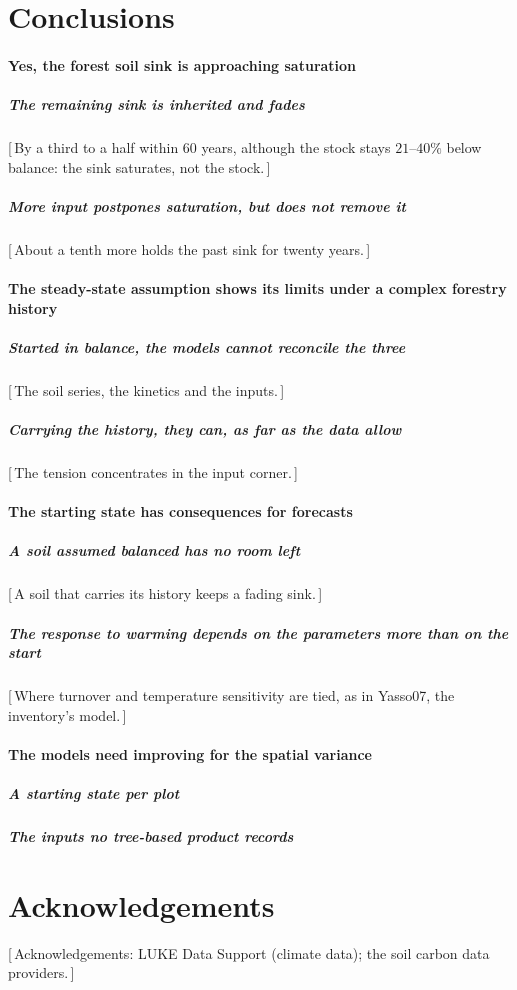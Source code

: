 \documentclass[11pt]{article}
\newcommand{\gap}[1]{\textcolor{red!70!black}{\small[\,#1\,]}}
\begin{document}
\section{Conclusions}\label{sec:conclusions}
\paragraph{Yes, the forest soil sink is approaching saturation}
\subparagraph{The remaining sink is inherited and fades}
\gap{By a third to a half within 60 years, although the stock stays $21$--$40\%$ below balance:
the sink saturates, not the stock.}
\subparagraph{More input postpones saturation, but does not remove it}
\gap{About a tenth more holds the past sink for twenty years.}
\paragraph{The steady-state assumption shows its limits under a complex forestry history}
\subparagraph{Started in balance, the models cannot reconcile the three}
\gap{The soil series, the kinetics and the inputs.}
\subparagraph{Carrying the history, they can, as far as the data allow}
\gap{The tension concentrates in the input corner.}
\paragraph{The starting state has consequences for forecasts}
\subparagraph{A soil assumed balanced has no room left}
\gap{A soil that carries its history keeps a fading sink.}
\subparagraph{The response to warming depends on the parameters more than on the start}
\gap{Where turnover and temperature sensitivity are tied, as in Yasso07, the inventory's model.}
\paragraph{The models need improving for the spatial variance}
\subparagraph{A starting state per plot}
\subparagraph{The inputs no tree-based product records}

\section*{Acknowledgements}
\gap{Acknowledgements: LUKE Data Support (climate data); the soil carbon data providers.}
\end{document}
